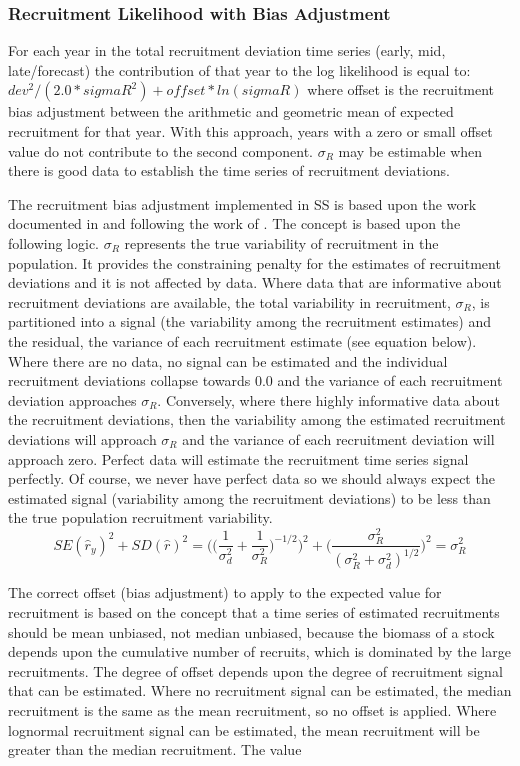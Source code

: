 \hypertarget{RecBias}{}
\subsubsection{Recruitment Likelihood with Bias Adjustment}
For each year in the total recruitment deviation time series (early, mid, late/forecast) the contribution of that year to the log likelihood is equal to:  $dev^2/(2.0*sigmaR^2)+offset*ln(sigmaR)$ where offset is the recruitment bias adjustment between the arithmetic and geometric mean of expected recruitment for that year.  With this approach, years with a zero or small offset value do not contribute to the second component. $\sigma_R$ may be estimable when there is good data to establish the time series of recruitment deviations.

The recruitment bias adjustment implemented in SS is based upon the work documented in \citet{methot_adjusting_2011} and following the work of \citet{maunder_estimation_2003}.  The concept is based upon the following logic.  $\sigma_R$ represents the true variability of recruitment in the population.  It provides the constraining penalty for the estimates of recruitment deviations and it is not affected by data.  Where data that are informative about recruitment deviations are available, the total variability in recruitment, $\sigma_R$, is partitioned into a signal (the variability among the recruitment estimates) and the residual, the variance of each recruitment estimate (see equation below).  Where there are no data, no signal can be estimated and the individual recruitment deviations collapse towards 0.0 and the variance of each recruitment deviation approaches $\sigma_R$.  Conversely, where there highly informative data about the recruitment deviations, then the variability among the estimated recruitment deviations will approach $\sigma_R$ and the variance of each recruitment deviation will approach zero.  Perfect data will estimate the recruitment time series signal perfectly.  Of course, we never have perfect data so we should always expect the estimated signal (variability among the recruitment deviations) to be less than the true population recruitment variability.
\begin{equation}
	SE(\hat{r}_y)^2 + SD(\hat{r})^2=\Bigg( \bigg( \frac{1}{\sigma^2_d}+\frac{1}{\sigma^2_R}\bigg)^{-1/2}\Bigg)^2+\Bigg( \frac{\sigma^2_R}{(\sigma^2_R+\sigma^2_d)^{1/2}}\Bigg)^2=\sigma^2_R
\end{equation}

The correct offset (bias adjustment) to apply to the expected value for recruitment is based on the concept that a time series of estimated recruitments should be mean unbiased, not median unbiased, because the biomass of a stock depends upon the cumulative number of recruits, which is dominated by the large recruitments.  The degree of offset depends upon the degree of recruitment signal that can be estimated.  Where no recruitment signal can be estimated, the median recruitment is the same as the mean recruitment, so no offset is applied.  Where lognormal recruitment signal can be estimated, the mean recruitment will be greater than the median recruitment.  The value

